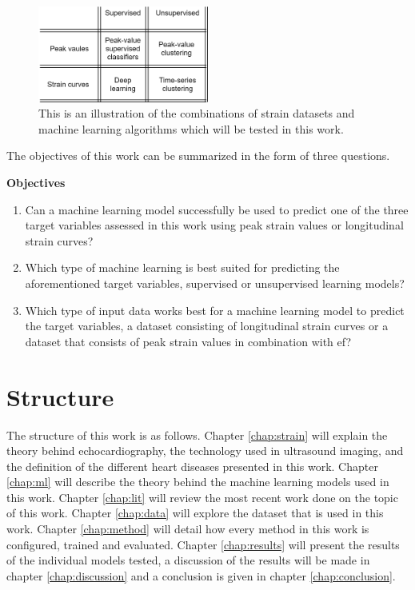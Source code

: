 \begin{figure}[H]
    \centering
    \includegraphics[width=0.5\textwidth]{intro/objectives_diagram.png}
    \caption{This is an illustration of the combinations of strain datasets and machine learning algorithms which will be tested in this work.}
    \label{fig:objectives_diagram}
\end{figure}

The objectives of this work can be summarized in the form of three questions.

\begin{tcolorbox}
    \textbf{Objectives}

    \begin{enumerate}
        \item Can a machine learning model successfully be used to predict one of the three target variables assessed in this work using peak strain values or longitudinal strain curves?
        \item Which type of machine learning is best suited for predicting the aforementioned target variables, supervised or unsupervised learning models?
        \item Which type of input data works best for a machine learning model to predict the target variables, a dataset consisting of longitudinal strain curves or a dataset that consists of peak strain values in combination with \acrshort{ef}?
    \end{enumerate}
\end{tcolorbox}

\section{Structure}

The structure of this work is as follows. Chapter \ref{chap:strain} will explain the theory behind echocardiography, the technology used in ultrasound imaging, and the definition of the different heart diseases presented in this work. Chapter \ref{chap:ml} will describe the theory behind the machine learning models used in this work. Chapter \ref{chap:lit} will review the most recent work done on the topic of this work. Chapter \ref{chap:data} will explore the dataset that is used in this work. Chapter \ref{chap:method} will detail how every method in this work is configured, trained and evaluated. Chapter \ref{chap:results} will present the results of the individual models tested, a discussion of the results will be made in chapter 
\ref{chap:discussion} and a conclusion is given in chapter \ref{chap:conclusion}.